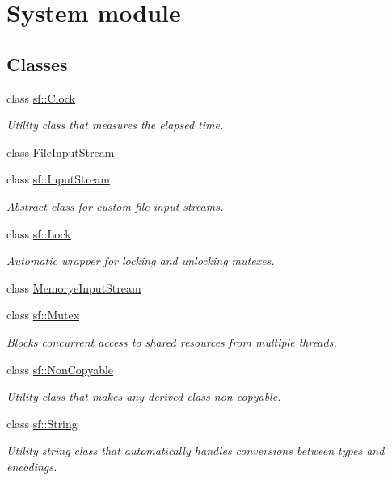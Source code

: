 \hypertarget{group__system}{\section{System module}
\label{group__system}
}
\subsection*{Classes}
\begin{DoxyCompactItemize}
\item 
class \hyperlink{classsf_1_1_clock}{sf\-::\-Clock}
\begin{DoxyCompactList}\small\item\em Utility class that measures the elapsed time. \end{DoxyCompactList}\item 
class \hyperlink{class_file_input_stream}{File\-Input\-Stream}
\item 
class \hyperlink{classsf_1_1_input_stream}{sf\-::\-Input\-Stream}
\begin{DoxyCompactList}\small\item\em Abstract class for custom file input streams. \end{DoxyCompactList}\item 
class \hyperlink{classsf_1_1_lock}{sf\-::\-Lock}
\begin{DoxyCompactList}\small\item\em Automatic wrapper for locking and unlocking mutexes. \end{DoxyCompactList}\item 
class \hyperlink{class_memorye_input_stream}{Memorye\-Input\-Stream}
\item 
class \hyperlink{classsf_1_1_mutex}{sf\-::\-Mutex}
\begin{DoxyCompactList}\small\item\em Blocks concurrent access to shared resources from multiple threads. \end{DoxyCompactList}\item 
class \hyperlink{classsf_1_1_non_copyable}{sf\-::\-Non\-Copyable}
\begin{DoxyCompactList}\small\item\em Utility class that makes any derived class non-\/copyable. \end{DoxyCompactList}\item 
class \hyperlink{classsf_1_1_string}{sf\-::\-String}
\begin{DoxyCompactList}\small\item\em Utility string class that automatically handles conversions between types and encodings. \end{DoxyCompactList}\item 

\end{DoxyCompactItemize}
